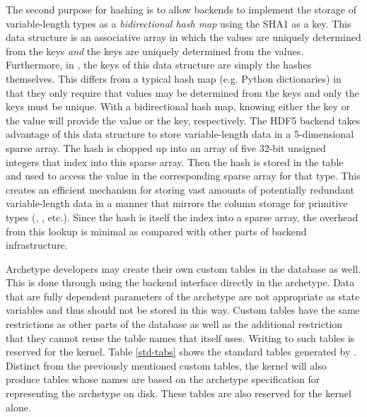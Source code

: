 The second purpose for hashing is to allow backends to implement the storage 
of variable-length types as a \emph{bidirectional hash map} using the 
\gls{SHA1} as a key.  This data structure is an associative array in which the values are 
uniquely determined from the keys \emph{and} the keys are uniquely
determined from 
the values. Furthermore, in \cyclus, the keys of this data structure are simply the 
hashes themselves. This differs from a typical hash map (e.g. Python dictionaries) 
in that they only require that values may be determined from the keys and only the
keys must be unique.  With a bidirectional hash map, knowing either the key or the value
will provide the value or the key, respectively.  The \gls{HDF5} backend takes advantage 
of this data structure to store variable-length data in a 5-dimensional sparse array.
The hash is chopped up into an array of five 32-bit unsigned integers that 
index into this sparse array. Then the hash is stored in the table and used to access 
the value in the corresponding sparse array for that type.  This creates an efficient 
mechanism for storing vast amounts of potentially redundant variable-length data in 
a manner that mirrors the column storage for primitive types (, , 
etc.). Since the hash is itself the index into a sparse array, the overhead from 
this lookup is minimal as compared with other parts of backend infrastructure.

Archetype developers may create their own custom tables in the database as well.
This is done through using the backend interface directly in the archetype. 
Data that are fully dependent parameters of the archetype are not appropriate 
as state variables and thus should not be stored in this way.  Custom tables 
have the same restrictions as other parts of the database as well as 
the additional restriction that they cannot reuse the table names that 
\cyclus itself uses. Writing to such tables is reserved for
the kernel. 
Table \ref{std-tabs} shows the standard tables generated by \cyclus.
Distinct from the previously mentioned custom tables, the kernel will also produce 
tables whose names are based on the 
archetype specification for representing the archetype on disk.  These tables
are also reserved for the kernel alone. 

